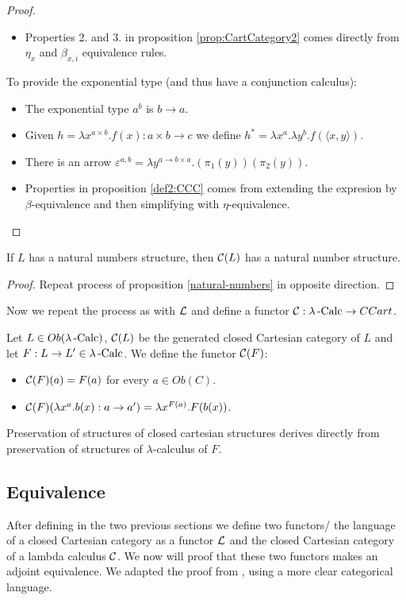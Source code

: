 \begin{definition}
\begin{proof}
\begin{itemize}
  \item Properties 2. and 3. in proposition \ref{prop:CartCategory2} comes directly from $\eta_x$ and $\beta_{x,i}$ equivalence rules.\\
  \end{itemize}
  To provide the exponential type (and thus have a conjunction calculus):
  \begin{itemize}
  \item The exponential type $a^b$ is $b\to a$.
  \item Given $h = \lambda x^{a\times b}. f(x): a\times b \to c$  we define $h^* = \lambda x^a. \lambda y^b. f(\langle x,y\rangle)$.
  \item There is an arrow $\varepsilon^{a,b} = \lambda y^{a\to b \times a}. (\pi_1(y))(\pi_2(y))$.
  \item Properties in proposition \ref{def2:CCC} comes from extending the expresion by $\beta$-equivalence and then simplifying with $\eta$-equivalence.
  \end{itemize}
\end{proof}

\begin{proposition}
  If $L$ has a natural numbers structure, then $\mathcal{C} (L)$ has a natural number structure.
\end{proposition}
\begin{proof}
  Repeat process of proposition \ref{natural-numbers} in opposite direction.
\end{proof}
Now we repeat the process as with $\mathcal{L}$ and define a functor $\mathcal{C}: \lambda\operatorname{-Calc} \to CCart$.
\begin{definition}
  Let $L\in Ob(\lambda\operatorname{-Calc})$, $\mathcal{C} (L)$ be the generated closed Cartesian category of $L$ and let $F:L\to L'\in \lambda\operatorname{-Calc}$.  We define the functor $\mathcal{C} (F)$:
  \begin{itemize}
  \item $\mathcal{C} (F) (a) = F(a)$ for every $a\in Ob(C)$.
  \item $\mathcal{C} (F) (\lambda x^a. b(x) :a \to a') = \lambda x^{F(a)}. F(b(x))$.
  \end{itemize}
\end{definition}
\begin{remark}
  Preservation of structures of closed cartesian structures derives directly from preservation of structures of $\lambda$-calculus of $F$.
\end{remark}


\subsection{Equivalence}
After defining in the two previous sections we define two functors/ the language of a closed Cartesian category as a functor $\mathcal{L}$ and the closed Cartesian category of a lambda calculus $\mathcal{C}$. We now will proof that these two functors makes an adjoint equivalence. We adapted the proof from \cite[Theorem 11.3]{lambek1988introduction}, using a more clear categorical language. 



\end{definition}
